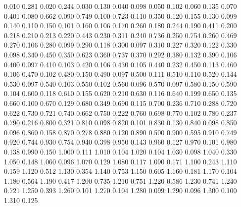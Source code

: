 %
%
0.010 0.281
0.020 0.244
0.030 0.130
0.040 0.098
0.050 0.102
0.060 0.135
0.070 0.401
0.080 0.662
0.090 0.749
0.100 0.723
0.110 0.350
0.120 0.155
0.130 0.099
0.140 0.110
0.150 0.101
0.160 0.106
0.170 0.260
0.180 0.244
0.190 0.411
0.200 0.218
0.210 0.213
0.220 0.443
0.230 0.311
0.240 0.736
0.250 0.754
0.260 0.469
0.270 0.106
0.280 0.099
0.290 0.118
0.300 0.097
0.310 0.227
0.320 0.122
0.330 0.098
0.340 0.450
0.350 0.623
0.360 0.737
0.370 0.292
0.380 0.132
0.390 0.106
0.400 0.097
0.410 0.103
0.420 0.106
0.430 0.105
0.440 0.232
0.450 0.113
0.460 0.106
0.470 0.102
0.480 0.150
0.490 0.097
0.500 0.111
0.510 0.110
0.520 0.144
0.530 0.097
0.540 0.103
0.550 0.102
0.560 0.096
0.570 0.097
0.580 0.150
0.590 0.104
0.600 0.118
0.610 0.155
0.620 0.210
0.630 0.116
0.640 0.199
0.650 0.135
0.660 0.100
0.670 0.129
0.680 0.349
0.690 0.115
0.700 0.236
0.710 0.288
0.720 0.622
0.730 0.721
0.740 0.662
0.750 0.222
0.760 0.698
0.770 0.102
0.780 0.237
0.790 0.216
0.800 0.321
0.810 0.098
0.820 0.101
0.830 0.130
0.840 0.098
0.850 0.096
0.860 0.158
0.870 0.278
0.880 0.120
0.890 0.500
0.900 0.595
0.910 0.749
0.920 0.744
0.930 0.754
0.940 0.398
0.950 0.143
0.960 0.127
0.970 0.101
0.980 0.138
0.990 0.150
1.000 0.111
1.010 0.104
1.020 0.104
1.030 0.098
1.040 0.330
1.050 0.148
1.060 0.096
1.070 0.129
1.080 0.117
1.090 0.171
1.100 0.243
1.110 0.159
1.120 0.512
1.130 0.354
1.140 0.753
1.150 0.605
1.160 0.181
1.170 0.104
1.180 0.564
1.190 0.417
1.200 0.735
1.210 0.751
1.220 0.586
1.230 0.741
1.240 0.721
1.250 0.393
1.260 0.101
1.270 0.104
1.280 0.099
1.290 0.096
1.300 0.100
1.310 0.125
